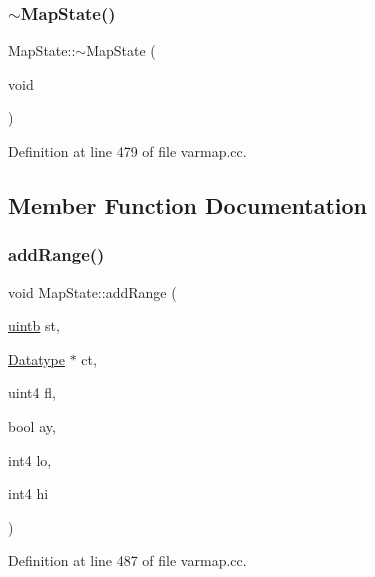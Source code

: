 \subsubsection{\texorpdfstring{$\sim$MapState()}{~MapState()}}
{\footnotesize\ttfamily Map\+State\+::$\sim$\+Map\+State (\begin{DoxyParamCaption}\item[{void}]{ }\end{DoxyParamCaption})}



Definition at line 479 of file varmap.\+cc.



\subsection{Member Function Documentation}
\mbox{\label{class_map_state_a89375399460ed36e13fbc9518ae7dad7}} 
\subsubsection{\texorpdfstring{addRange()}{addRange()}\hspace{0.1cm}{\footnotesize\ttfamily [1/2]}}
{\footnotesize\ttfamily void Map\+State\+::add\+Range (\begin{DoxyParamCaption}\item[{\mbox{\hyperlink{types_8h_a2db313c5d32a12b01d26ac9b3bca178f}{uintb}}}]{st,  }\item[{\mbox{\hyperlink{class_datatype}{Datatype}} $\ast$}]{ct,  }\item[{uint4}]{fl,  }\item[{bool}]{ay,  }\item[{int4}]{lo,  }\item[{int4}]{hi }\end{DoxyParamCaption})}



Definition at line 487 of file varmap.\+cc.

